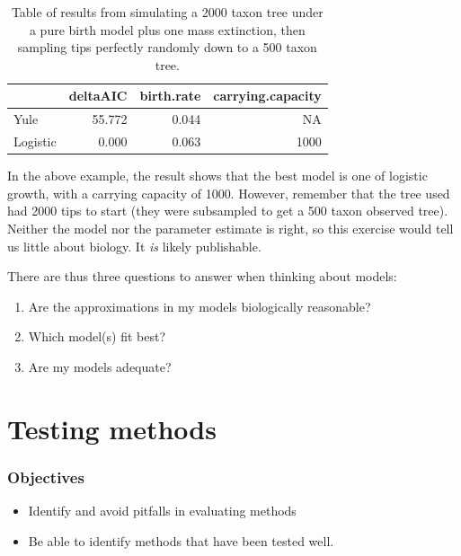 \documentclass[]{article}
\providecommand{\tightlist}{%
  \setlength{\itemsep}{0pt}\setlength{\parskip}{0pt}}
\begin{document}
\begin{table}

\caption{\label{tab:unnamed-chunk-8}Table of results from simulating a 2000 taxon tree under a pure birth model plus one mass extinction, then sampling tips perfectly randomly down to a 500 taxon tree.}
\centering
\begin{tabular}[t]{l|r|r|r}
\hline
  & deltaAIC & birth.rate & carrying.capacity\\
\hline
Yule & 55.772 & 0.044 & NA\\
\hline
Logistic & 0.000 & 0.063 & 1000\\
\hline
\end{tabular}
\end{table}

In the above example, the result shows that the best model is one of logistic growth, with a carrying capacity of 1000. However, remember that the tree used had 2000 tips to start (they were subsampled to get a 500 taxon observed tree). Neither the model nor the parameter estimate is right, so this exercise would tell us little about biology. It \emph{is} likely publishable.

There are thus three questions to answer when thinking about models:

\begin{enumerate}
\def\labelenumi{\arabic{enumi})}
\tightlist
\item
  Are the approximations in my models biologically reasonable?
\item
  Which model(s) fit best?
\item
  Are my models adequate?
\end{enumerate}

\hypertarget{testing-methods}{%
\section{Testing methods}\label{testing-methods}}

\hypertarget{objectives-1}{%
\subsubsection{Objectives}\label{objectives-1}}

\begin{itemize}
\tightlist
\item
  Identify and avoid pitfalls in evaluating methods
\item
  Be able to identify methods that have been tested well.
\end{itemize}
\end{document}
